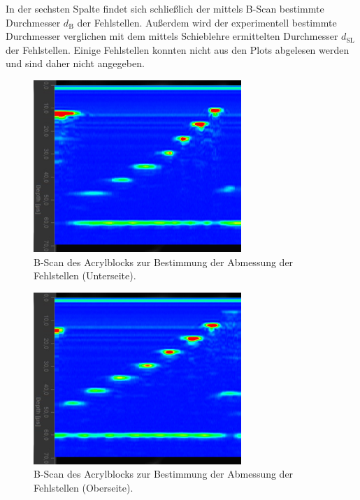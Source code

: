 In der sechsten Spalte findet sich schließlich der mittels B-Scan bestimmte Durchmesser $d_\mathrm{B}$ der Fehlstellen. Außerdem wird der experimentell bestimmte Durchmesser verglichen mit dem mittels Schieblehre ermittelten Durchmesser $d_\mathrm{SL}$ der Fehlstellen.
Einige Fehlstellen konnten nicht aus den Plots abgelesen werden und sind daher nicht angegeben.
\begin{figure}
  \centering
  \includegraphics[width=0.7\textwidth]{bscan/bscan2rueck}
  \caption{B-Scan des Acrylblocks zur Bestimmung der Abmessung der Fehlstellen (Unterseite).}
  \label{fig:b2}
\end{figure}

\begin{figure}
  \centering
  \includegraphics[width=0.7\textwidth]{bscan/bscan2}
  \caption{B-Scan des Acrylblocks zur Bestimmung der Abmessung der Fehlstellen (Oberseite).}
  \label{fig:b1}
\end{figure}

